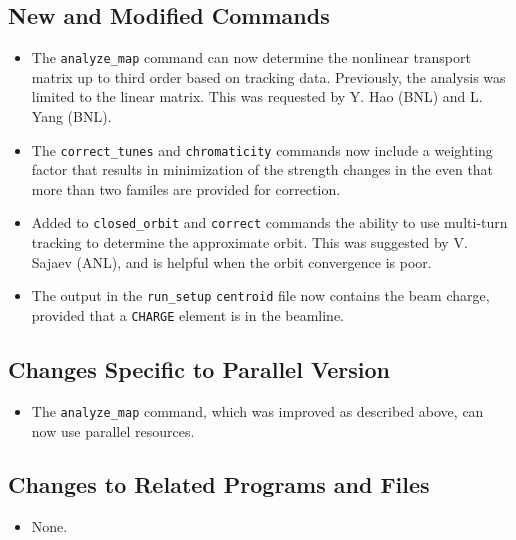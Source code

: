 \documentclass[11pt]{article}
\begin{document}
\subsection{New and Modified Commands}
\begin{itemize}
\item The \verb|analyze_map| command can now determine the nonlinear transport matrix up to third order based on tracking data.
  Previously, the analysis was limited to the linear matrix. This was requested by Y. Hao (BNL) and L. Yang (BNL).
\item The \verb|correct_tunes| and \verb|chromaticity| commands now include a weighting factor that results in minimization of
  the strength changes in the even that more than two familes are provided for correction.
\item Added to \verb|closed_orbit| and \verb|correct| commands the ability to use multi-turn tracking to determine the approximate orbit.
  This was suggested by V. Sajaev (ANL), and is helpful when the orbit convergence is poor.
\item The output in the \verb|run_setup| \verb|centroid| file now contains the beam charge, provided that
  a \verb|CHARGE| element is in the beamline.
\end{itemize}

\subsection{Changes Specific to Parallel Version}

\begin{itemize}
\item The \verb|analyze_map| command, which was improved as described above, can now use parallel resources.
\end{itemize}

\subsection{Changes to Related Programs and Files}

\begin{itemize}
\item None.
\end{itemize}
\end{document}
